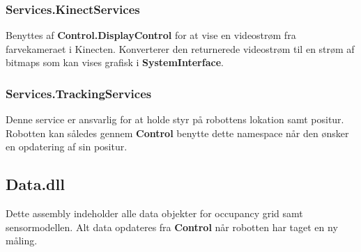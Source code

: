 \subsubsection{Services.KinectServices}
Benyttes af \textbf{Control.DisplayControl} for at vise en videostrøm fra farvekameraet i Kinecten.
Konverterer den returnerede videostrøm til en strøm af bitmaps som kan vises grafisk i \textbf{SystemInterface}.

\subsubsection{Services.TrackingServices}
Denne service er ansvarlig for at holde styr på robottens lokation samt positur.
Robotten kan således gennem \textbf{Control} benytte dette namespace når den ønsker en opdatering af sin positur.

\subsection{Data.dll}\label{arkitektur:data}
Dette assembly indeholder alle data objekter for occupancy grid samt sensormodellen.
Alt data opdateres fra \textbf{Control} når robotten har taget en ny måling.






